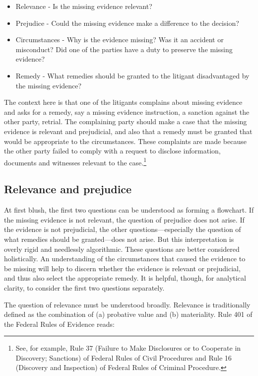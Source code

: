 \documentclass[
  10pt,
  dvipsnames,enabledeprecatedfontcommands]{scrartcl}
\begin{document}
\begin{itemize}
\item[] Relevance - Is the missing evidence relevant?
\item[] Prejudice - Could the missing evidence make a difference to the decision?
\item[] Circumstances - Why is the evidence missing? Was it an accident or misconduct? Did one of the parties have a duty to preserve the missing evidence?
\item[] Remedy - What remedies should be granted to the litigant disadvantaged 
by the missing evidence?
\end{itemize}

\noindent The context here is that one of the litigants complains about
missing evidence and asks for a remedy, say a missing evidence
instruction, a sanction against the other party, retrial. The
complaining party should make a case that the missing evidence is
relevant and prejudicial, and also that a remedy must be granted that
would be appropriate to the circumstances. These complaints are made
because the other party failed to comply with a request to disclose
information, documents and witnesses relevant to the case.\footnote{See,
  for example, Rule 37 (Failure to Make Disclosures or to Cooperate in
  Discovery; Sanctions) of Federal Rules of Civil Procedures and Rule 16
  (Discovery and Inspection) of Federal Rules of Criminal Procedure.}

\hypertarget{relevance-and-prejudice}{%
\subsection{Relevance and prejudice}\label{relevance-and-prejudice}}

At first blush, the first two questions can be understood as forming a
flowchart. If the missing evidence is not relevant, the question of
prejudice does not arise. If the evidence is not prejudicial, the other
questions---especially the question of what remedies should be
granted---does not arise. But this interpretation is overly rigid and
needlessly algorithmic. These questions are better considered
holistically. An understanding of the circumstances that caused the
evidence to be missing will help to discern whether the evidence is
relevant or prejudicial, and thus also select the appropriate remedy. It
is helpful, though, for analytical clarity, to consider the first two
questions separately.

The question of relevance must be understood broadly. Relevance is
traditionally defined as the combination of (a) probative value and (b)
materiality. Rule 401 of the Federal Rules of Evidence reads:
\end{document}
